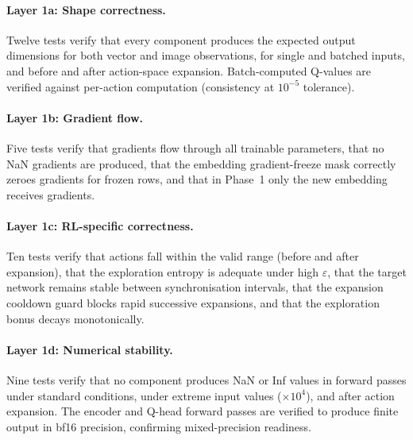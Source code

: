 \documentclass{article}
\begin{document}
\paragraph{Layer 1a: Shape correctness.}
Twelve tests verify that every component produces the expected output
dimensions for both vector and image observations, for single and batched
inputs, and before and after action-space expansion. Batch-computed Q-values
are verified against per-action computation (consistency at $10^{-5}$
tolerance).

\paragraph{Layer 1b: Gradient flow.}
Five tests verify that gradients flow through all trainable parameters, that no
NaN gradients are produced, that the embedding gradient-freeze mask correctly
zeroes gradients for frozen rows, and that in Phase~1 only the new embedding
receives gradients.

\paragraph{Layer 1c: RL-specific correctness.}
Ten tests verify that actions fall within the valid range (before and after
expansion), that the exploration entropy is adequate under high $\varepsilon$,
that the target network remains stable between synchronisation intervals, that
the expansion cooldown guard blocks rapid successive expansions, and that the
exploration bonus decays monotonically.

\paragraph{Layer 1d: Numerical stability.}
Nine tests verify that no component produces NaN or Inf values in forward
passes under standard conditions, under extreme input values ($\times 10^4$),
and after action expansion. The encoder and Q-head forward passes are verified
to produce finite output in bf16 precision, confirming mixed-precision
readiness.
\end{document}
